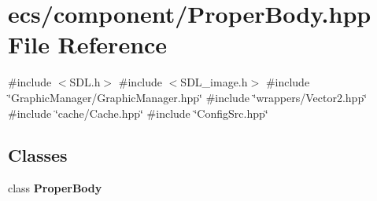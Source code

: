 \section{ecs/component/\+Proper\+Body.hpp File Reference}
\label{_proper_body_8hpp}
{\ttfamily \#include $<$S\+D\+L.\+h$>$}\newline
{\ttfamily \#include $<$S\+D\+L\+\_\+image.\+h$>$}\newline
{\ttfamily \#include \char`\"{}Graphic\+Manager/\+Graphic\+Manager.\+hpp\char`\"{}}\newline
{\ttfamily \#include \char`\"{}wrappers/\+Vector2.\+hpp\char`\"{}}\newline
{\ttfamily \#include \char`\"{}cache/\+Cache.\+hpp\char`\"{}}\newline
{\ttfamily \#include \char`\"{}Config\+Src.\+hpp\char`\"{}}\newline
\subsection*{Classes}
\begin{DoxyCompactItemize}
\item 
class \textbf{ Proper\+Body}
\end{DoxyCompactItemize}
